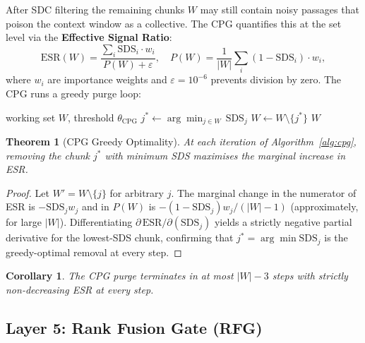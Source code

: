 \documentclass[10pt,twocolumn]{article}
\newtheorem{theorem}{Theorem}
\newtheorem{corollary}{Corollary}
\begin{document}
After SDC filtering the remaining chunks $W$ may still contain noisy passages
that poison the context window as a collective.  The CPG quantifies this at
the set level via the \textbf{Effective Signal Ratio}:
\begin{equation}\label{eq:esr}
  \text{ESR}(W) = \frac{\sum_{i} \text{SDS}_i \cdot w_i}{P(W) + \varepsilon},
  \quad P(W) = \frac{1}{|W|}\sum_i (1-\text{SDS}_i)\cdot w_i,
\end{equation}
where $w_i$ are importance weights and $\varepsilon = 10^{-6}$ prevents
division by zero.  The CPG runs a greedy purge loop:

\begin{algorithm}[H]
\caption{Greedy CPG Purge}
\label{alg:cpg}
\begin{algorithmic}[1]
\REQUIRE working set $W$, threshold $\theta_\text{CPG}$
  \STATE $j^* \leftarrow \arg\min_{j \in W}\,\text{SDS}_j$
  \STATE $W \leftarrow W \setminus \{j^*\}$
\ENDWHILE
\RETURN $W$
\end{algorithmic}
\end{algorithm}

\begin{theorem}[CPG Greedy Optimality]\label{thm:cpg}
  At each iteration of Algorithm~\ref{alg:cpg}, removing the chunk $j^*$ with
  minimum SDS maximises the marginal increase in ESR.
\end{theorem}
\begin{proof}
  Let $W' = W \setminus \{j\}$ for arbitrary $j$.  The marginal change in the
  numerator of ESR is $-\text{SDS}_j w_j$ and in $P(W)$ is
  $-(1-\text{SDS}_j)w_j / (|W|-1)$ (approximately, for large $|W|$).
  Differentiating $\partial\,\text{ESR} / \partial(\text{SDS}_j)$ yields a
  strictly negative partial derivative for the lowest-SDS chunk, confirming
  that $j^* = \arg\min \text{SDS}_j$ is the greedy-optimal removal at every
  step.
\end{proof}

\begin{corollary}
  The CPG purge terminates in at most $|W|-3$ steps with strictly
  non-decreasing ESR at every step.
\end{corollary}

\subsection{Layer 5: Rank Fusion Gate (RFG)}\label{ssec:rfg}
\end{document}
